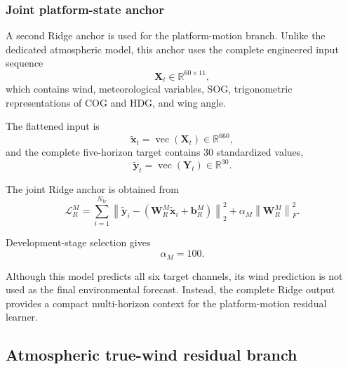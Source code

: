 \subsubsection{Joint platform-state anchor}
\label{subsubsec:motion_anchor}

A second Ridge anchor is used for the platform-motion branch. Unlike the dedicated atmospheric model, this anchor uses the complete engineered input sequence
\begin{equation}
\mathbf X_t
\in
\mathbb R^{60\times11},
\end{equation}
which contains wind, meteorological variables, SOG, trigonometric representations of COG and HDG, and wing angle.

The flattened input is
\begin{equation}
\tilde{\mathbf x}_t
=
\operatorname{vec}
\left(
\mathbf X_t
\right)
\in
\mathbb R^{660},
\label{eq:joint_flat_input}
\end{equation}
and the complete five-horizon target contains 30 standardized values,
\begin{equation}
\tilde{\mathbf y}_t
=
\operatorname{vec}
\left(
\mathbf Y_t
\right)
\in
\mathbb R^{30}.
\label{eq:joint_flat_target}
\end{equation}

The joint Ridge anchor is obtained from
\begin{equation}
\mathcal L_R^M
=
\sum_{i=1}^{N_{\mathrm{tr}}}
\left\|
\tilde{\mathbf y}_i
-
\left(
\mathbf W_R^M
\tilde{\mathbf x}_i
+
\mathbf b_R^M
\right)
\right\|_2^2
+
\alpha_M
\left\|
\mathbf W_R^M
\right\|_F^2.
\label{eq:motion_ridge_loss}
\end{equation}

Development-stage selection gives
\begin{equation}
\alpha_M=100.
\label{eq:motion_ridge_alpha}
\end{equation}

Although this model predicts all six target channels, its wind prediction is not used as the final environmental forecast. Instead, the complete Ridge output provides a compact multi-horizon context for the platform-motion residual learner.

\subsection{Atmospheric true-wind residual branch}
\label{subsec:wind_residual}

